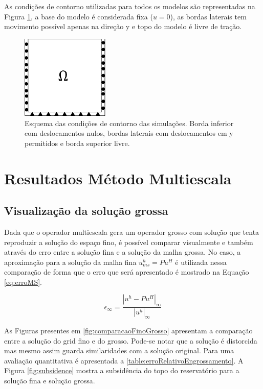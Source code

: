 As condições de contorno utilizadas para todos os modelos são representadas na Figura \ref{fig:CondicoesContorno}, a base do modelo é considerada fixa ($u=0$), as bordas laterais tem movimento possível apenas na direção y e topo do modelo é livre de tração.

\begin{figure}[!htbp]
    \centering
    \includegraphics[height=4cm]{chap08/figs/CondicoesContorno.png}
    \caption{Esquema das condições de contorno das simulações. Borda inferior com deslocamentos nulos, bordas laterais com deslocamentos em y permitidos e borda superior livre.}
    \label{fig:CondicoesContorno}
\end{figure}


\section{Resultados Método Multiescala}

\subsection{Visualização da solução grossa}

Dada que o operador multiescala gera um operador grosso com solução que tenta reproduzir a solução do espaço fino, é possível comparar visualmente e também através do erro entre a solução fina e a solução da malha grossa. No caso, a aproximação para a solução da malha fina $u^h_{ms} = P u^H$ é utilizada nessa comparação de forma que o erro que será apresentado é mostrado na Equação \eqref{eq:erroMS}.

\begin{equation}\label{eq:erroMS}
\epsilon_{\infty} =\frac{|u^h - P u^H|_{\infty}}{|u^h|_{\infty}}
\end{equation}


As Figuras presentes em \ref{fig:comparacaoFinoGrosso} apresentam a comparação entre a solução do grid fino e do grosso. Pode-se notar que a solução é distorcida mas mesmo assim guarda similaridades com a solução original. Para uma avaliação quantitativa é apresentada a \ref{table:erroRelativoEngrossamento}. A Figura \ref{fig:subsidence} mostra a subsidência do topo do reservatório para a solução fina e solução grossa.


